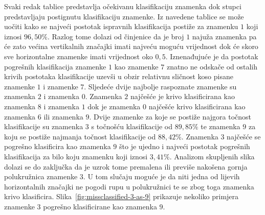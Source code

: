 Svaki redak tablice predstavlja očekivanu klasifikaciju znamenka dok stupci predstavljaju postignutu klasifikaciju
znamenke. Iz navedene tablice se može uočiti kako se najveći postotak ispravnih klasifikacija postiže za znamenku $1$
koji iznosi $96{,}50\%$. Razlog tome dolazi od činjenice da je broj $1$ najuža znamenka pa će zato većina vertikalnih
značajki imati najveću moguću vrijednost dok će skoro sve horizontalne znamenke imati vrijednost oko $0{,}5$.
Iznenađujuće je da postotak pogrešnih klasifikacija znamenke $1$ kao znamenke $7$ znatno ne odskače od ostalih krivih
postotaka klasifikacije uzevši u obzir relativnu sličnost koso pisane znamenke $1$ i znamenke $7$. Sljedeće dvije
najbolje raspoznate znamenke su znamenka $2$ i znamenka $0$. Znamenka $2$ najčešće je krivo klasificirana kao znamenka
$8$ i znamenka $1$ dok je znamenka $0$ najčešće krivo klasificirana kao znamenka $6$ ili znamenka $9$. Dvije znamenke za
koje se postiže najgora točnost klasifikacije su znamenka $3$ s točnošću klasifikacije od $89{,}85\%$ te znamenka $9$ za
koju se postiže najmanja točnost klasifikacije od $88{,}42\%$. Znamenka $3$ najčešće se pogrešno klasificira kao
znamenka $9$ što je ujedno i najveći postotak pogrešnih klasifikacija za bilo koju znamenku koji iznosi $3{,}41\%$.
Analizom skupljenih slika dolazi se do zaključka da je uzrok tome premalena ili previše nakošena gornja polukružnica
znamenke $3$. U tom slučaju moguće je da niti jedna od lijevih horizontalnih značajki ne pogodi rupu u polukružnici te
se zbog toga znamenka krivo klasificira. Slika\ \ref{fig:missclassified-3-as-9} prikazuje nekoliko primjera znamenke $3$
pogrešno klasificirane kao znamenka $9$.
